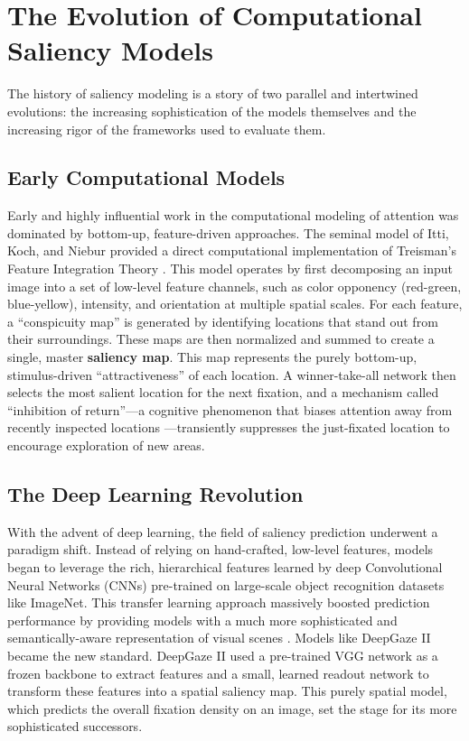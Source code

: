 \section{The Evolution of Computational Saliency Models}
\label{sec:sota_evolution}
The history of saliency modeling is a story of two parallel and intertwined evolutions: the increasing sophistication of the models themselves and the increasing rigor of the frameworks used to evaluate them.

\subsection{Early Computational Models}
Early and highly influential work in the computational modeling of attention was dominated by bottom-up, feature-driven approaches. The seminal model of Itti, Koch, and Niebur \cite{itti1998} provided a direct computational implementation of Treisman's Feature Integration Theory \cite{treisman1980}. This model operates by first decomposing an input image into a set of low-level feature channels, such as color opponency (red-green, blue-yellow), intensity, and orientation at multiple spatial scales.
For each feature, a \enquote{conspicuity map} is generated by identifying locations that stand out from their surroundings. These maps are then normalized and summed to create a single, master \textbf{saliency map}. This map represents the purely bottom-up, stimulus-driven \enquote{attractiveness} of each location. A winner-take-all network then selects the most salient location for the next fixation, and a mechanism called \enquote{inhibition of return}—a cognitive phenomenon that biases attention away from recently inspected locations \cite{posner1984}—transiently suppresses the just-fixated location to encourage exploration of new areas.

\subsection{The Deep Learning Revolution}
With the advent of deep learning, the field of saliency prediction underwent a paradigm shift. Instead of relying on hand-crafted, low-level features, models began to leverage the rich, hierarchical features learned by deep Convolutional Neural Networks (CNNs) pre-trained on large-scale object recognition datasets like ImageNet. This transfer learning approach massively boosted prediction performance by providing models with a much more sophisticated and semantically-aware representation of visual scenes \cite{kummerer2017deepgaze2}.
Models like DeepGaze II \cite{kummerer2017deepgaze2} became the new standard. DeepGaze II used a pre-trained VGG network as a frozen backbone to extract features and a small, learned readout network to transform these features into a spatial saliency map. This purely spatial model, which predicts the overall fixation density on an image, set the stage for its more sophisticated successors.

